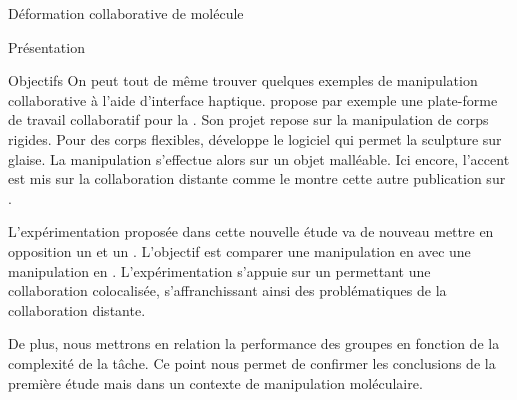 \documentclass[myfrancais]{mythesis}
\begin{document}
\begin{mychapter}{Déformation collaborative de molécule}
\begin{mysection}{Présentation}
\begin{mysubsection}{Objectifs}
				On peut tout de même trouver quelques exemples de manipulation collaborative à l'aide d'interface haptique.
				 propose par exemple une plate-forme de travail collaboratif pour la .
				Son projet repose sur la manipulation de corps rigides.
				Pour des corps flexibles,  développe le logiciel \myClayWorks qui permet la sculpture sur glaise.
				La manipulation s'effectue alors sur un objet malléable.
				Ici encore, l'accent est mis sur la collaboration distante comme le montre cette autre publication sur \myClayWorks {}.

				L'expérimentation proposée dans cette nouvelle étude va de nouveau mettre en opposition un  et un .
				L'objectif est comparer une manipulation  en  avec une manipulation  en .
				L'expérimentation s'appuie sur un  permettant une collaboration colocalisée, s'affranchissant ainsi des problématiques de la collaboration distante.

				De plus, nous mettrons en relation la performance des groupes en fonction de la complexité de la tâche.
				Ce point nous permet de confirmer les conclusions de la première étude mais dans un contexte de manipulation moléculaire.


\end{mysubsection}
\end{mysection}
\end{mychapter}
\end{document}
